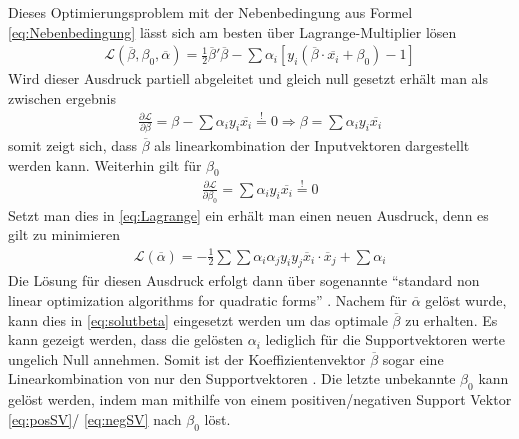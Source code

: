 \documentclass[
]{article}
\begin{document}
Dieses Optimierungsproblem mit der Nebenbedingung aus Formel
\eqref{eq:Nebenbedingung} lässt sich am besten über Lagrange-Multiplier
lösen \begin{align}
\mathcal{L}(\overline\beta,\beta_0,\overline \alpha)=\frac{1}{2}\overline \beta ' \overline \beta-\sum \alpha_i[y_i(\overline \beta \cdot \overline{x_i}+\beta_0)-1]\label{eq:Lagrange}
\end{align} Wird dieser Ausdruck partiell abgeleitet und gleich null
gesetzt erhält man als zwischen ergebnis \begin{align}
\frac{\partial \mathcal{L}}{\partial \beta}=\beta-\sum \alpha_i y_i \overline{x_i}\overset{!}{=}0 \Rightarrow \beta=\sum \alpha_i y_i \overline{x_i}\label{eq:solutbeta}
\end{align} somit zeigt sich, dass \(\overline{\beta}\) als
linearkombination der Inputvektoren dargestellt werden kann. Weiterhin
gilt für \(\beta_0\) \begin{align}
\frac{\partial \mathcal{L}}{\partial \beta_0}=\sum \alpha_i y_i \overline{x_i}\overset{!}{=}0\label{eq:solutbeta0}
\end{align} Setzt man dies in \eqref{eq:Lagrange} ein erhält man einen
neuen Ausdruck, denn es gilt zu minimieren \begin{align}
\mathcal{L}(\overline \alpha)=-\frac{1}{2}\sum \sum \alpha_i \alpha_j y_i y_j \overline{x}_i \cdot \overline{x}_j+\sum \alpha_i\label{eq:dualproblem}
\end{align} Die Lösung für diesen Ausdruck erfolgt dann über sogenannte
\enquote{standard non linear optimization algorithms for quadratic forms}
\parencite{boserTrainingAlgorithmOptimal1992}. Nachem für
\(\overline \alpha\) gelöst wurde, kann dies in \eqref{eq:solutbeta}
eingesetzt werden um das optimale \(\overline{\beta}\) zu erhalten. Es
kann gezeigt werden, dass die gelösten \(\alpha_i\) lediglich für die
Supportvektoren werte ungelich Null annehmen. Somit ist der
Koeffizientenvektor \(\overline{\beta}\) sogar eine Linearkombination
von nur den Supportvektoren
\parencite{boserTrainingAlgorithmOptimal1992}. Die letzte unbekannte
\(\beta_0\) kann gelöst werden, indem man mithilfe von einem
positiven/negativen Support Vektor \eqref{eq:posSV}/ \eqref{eq:negSV}
nach \(\beta_0\) löst.
\end{document}
